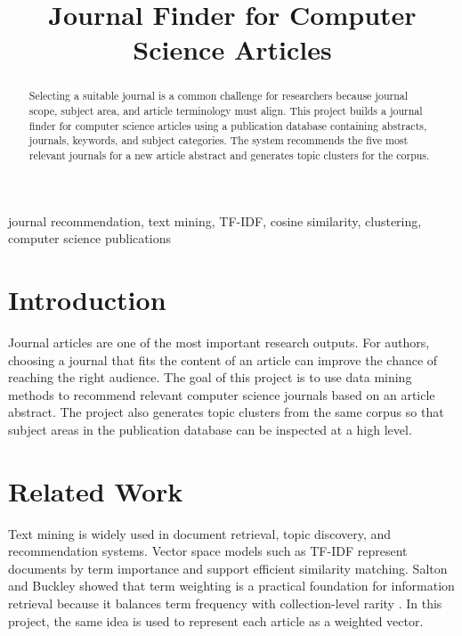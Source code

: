 \documentclass[conference]{IEEEtran}
\begin{document}
\title{Journal Finder for Computer Science Articles}

\author{
}

\maketitle

\begin{abstract}
Selecting a suitable journal is a common challenge for researchers because journal scope, subject area, and article terminology must align. This project builds a journal finder for computer science articles using a publication database containing abstracts, journals, keywords, and subject categories. The system recommends the five most relevant journals for a new article abstract and generates topic clusters for the corpus.
\end{abstract}

\begin{IEEEkeywords}
journal recommendation, text mining, TF-IDF, cosine similarity, clustering, computer science publications
\end{IEEEkeywords}

\section{Introduction}
Journal articles are one of the most important research outputs. For authors, choosing a journal that fits the content of an article can improve the chance of reaching the right audience. The goal of this project is to use data mining methods to recommend relevant computer science journals based on an article abstract. The project also generates topic clusters from the same corpus so that subject areas in the publication database can be inspected at a high level.

\section{Related Work}
Text mining is widely used in document retrieval, topic discovery, and recommendation systems. Vector space models such as TF-IDF represent documents by term importance and support efficient similarity matching. Salton and Buckley showed that term weighting is a practical foundation for information retrieval because it balances term frequency with collection-level rarity \cite{salton1988term}. In this project, the same idea is used to represent each article as a weighted vector.
\end{document}
